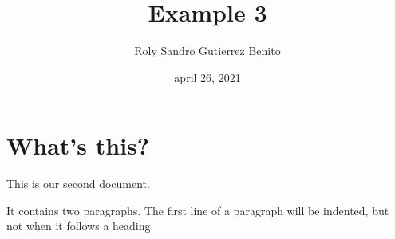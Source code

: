 \documentclass[a4paper, 11pt]{article}
\begin{document}
\title{Example 3}
\author{Roly Sandro Gutierrez Benito}
\date{ april 26, 2021}
\section{What's this?}
This is our second document.

It contains two paragraphs. The first line of a paragraph will be indented, but not when it follows a heading.
\end{document}
